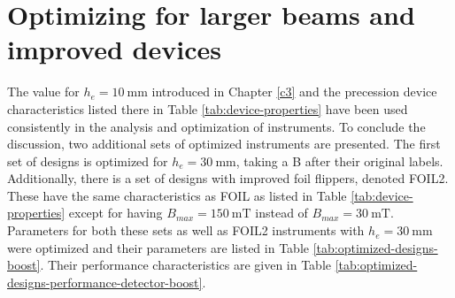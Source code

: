 \section{Optimizing for larger beams and improved devices}
The value for $h_e = \SI{10}{\milli\meter}$ introduced in Chapter \ref{c3} and the precession device characteristics listed there in Table \ref{tab:device-properties} have been used consistently in the analysis and optimization of instruments. To conclude the discussion, two additional sets of optimized instruments are presented. The first set of designs is optimized for $h_e = \SI{30}{\milli\meter}$, taking a B after their original labels. Additionally, there is a set of designs with improved foil flippers, denoted FOIL2. These have the same characteristics as FOIL as listed in Table \ref{tab:device-properties} except for having $B_{max} = \SI{150}{\milli\tesla}$ instead of $B_{max} = \SI{30}{\milli\tesla}$. Parameters for both these sets as well as FOIL2 instruments with $h_e = \SI{30}{\milli\meter}$ were optimized and their parameters are listed in Table \ref{tab:optimized-designs-boost}. Their performance characteristics are given in Table \ref{tab:optimized-designs-performance-detector-boost}. 
